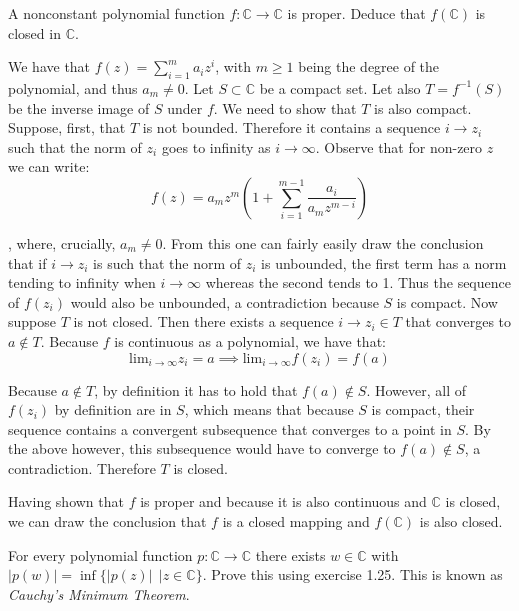 \begin{exercise}{25}
    A nonconstant polynomial function $f: \mathbb{C} \rightarrow \mathbb{C}$ is proper. Deduce that $f(\mathbb{C})$ is closed in $\mathbb{C}$.
\end{exercise}

\begin{solution}

    We have that $f(z) = \sum_{i=1}^m a_iz^i$, with $m \geq 1$ being the degree of the polynomial, and thus $a_m \neq 0$. Let $S \subset \mathbb{C}$ be a compact set. Let also $T = f^{-1}(S)$ be the inverse image of $S$ under $f$. We need to show that $T$ is also compact. Suppose, first, that $T$ is not bounded. Therefore it contains a sequence $i \rightarrow z_i$ such that the norm of $z_i$ goes to infinity as $i \rightarrow \infty$. Observe that for non-zero $z$ we can write:
    $$f(z) = a_m z^m (1 + \sum_{i=1}^{m-1} \frac{a_i}{a_m z^{m-i}})$$

    , where, crucially, $a_m \neq 0$. From this one can fairly easily draw the conclusion that if $i \rightarrow z_i$ is such that the norm of $z_i$ is unbounded, the first term has a norm tending to infinity when $i \rightarrow \infty$ whereas the second tends to 1. Thus the sequence of $f(z_i)$ would also be unbounded, a contradiction because $S$ is compact.
    Now suppose $T$ is not closed. Then there exists a sequence $i \rightarrow z_i \in T$ that converges to $a \notin T$. Because $f$ is continuous as a polynomial, we have that:
    $$\text{lim}_{i \rightarrow \infty} z_i = a \implies \text{lim}_{i \rightarrow \infty} f(z_i) = f(a)$$
    
    Because $a \notin T$, by definition it has to hold that $f(a) \notin S$. However, all of $f(z_i)$ by definition are in $S$, which means that because $S$ is compact, their sequence contains a convergent subsequence that converges to a point in $S$. By the above however, this subsequence would have to converge to $f(a) \notin S$, a contradiction. Therefore $T$ is closed.

    Having shown that $f$ is proper and because it is also continuous and $\mathbb{C}$ is closed, we can draw the conclusion that $f$ is a closed mapping and $f(\mathbb{C})$ is also closed.
\end{solution}

\begin{exercise}{28}
    For every polynomial function $p: \mathbb{C} \rightarrow \mathbb{C}$ there exists $w \in \mathbb{C}$ with $\lvert p(w) \rvert = \inf\{\lvert p(z) \rvert \ \ \rvert z \in \mathbb{C}\}$. Prove this using exercise 1.25. This is known as \textit{Cauchy's Minimum Theorem}.
\end{exercise}

